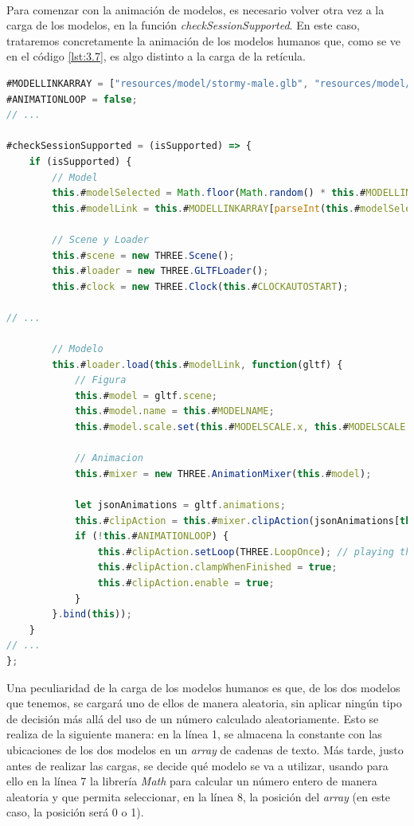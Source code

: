 \documentclass{subfiles}
\begin{document}
        \paragraph{}
        Para comenzar con la animación de modelos, es necesario volver otra vez a la carga de los modelos, en la función \textit{checkSessionSupported}. En este caso, trataremos concretamente la animación de los modelos humanos que, como se ve en el código \ref{lst:3.7}, es algo distinto a la carga de la retícula.

\newpage
\begin{lstlisting}[language=JavaScript, caption={Carga de modelo humano.}, label={lst:3.7}, float=ht]
#MODELLINKARRAY = ["resources/model/stormy-male.glb", "resources/model/stormie-female.glb"];
#ANIMATIONLOOP = false;
// ...

#checkSessionSupported = (isSupported) => {
    if (isSupported) {
        // Model
        this.#modelSelected = Math.floor(Math.random() * this.#MODELLINKARRAY.length);
        this.#modelLink = this.#MODELLINKARRAY[parseInt(this.#modelSelected)];

        // Scene y Loader
        this.#scene = new THREE.Scene();
        this.#loader = new THREE.GLTFLoader();
        this.#clock = new THREE.Clock(this.#CLOCKAUTOSTART);

// ...

        // Modelo
        this.#loader.load(this.#modelLink, function(gltf) {
            // Figura
            this.#model = gltf.scene;
            this.#model.name = this.#MODELNAME;
            this.#model.scale.set(this.#MODELSCALE.x, this.#MODELSCALE.y, this.#MODELSCALE.z);

            // Animacion
            this.#mixer = new THREE.AnimationMixer(this.#model);

            let jsonAnimations = gltf.animations;
            this.#clipAction = this.#mixer.clipAction(jsonAnimations[this.#MODELANIMATIONNUMBER]);
            if (!this.#ANIMATIONLOOP) {
                this.#clipAction.setLoop(THREE.LoopOnce); // playing the clip once
                this.#clipAction.clampWhenFinished = true;
                this.#clipAction.enable = true;
            }
        }.bind(this));
    } 
// ...
};
\end{lstlisting}

        Una peculiaridad de la carga de los modelos humanos es que, de los dos modelos que tenemos, se cargará uno de ellos de manera aleatoria, sin aplicar ningún tipo de decisión más allá del uso de un número calculado aleatoriamente. Esto se realiza de la siguiente manera: en la línea 1, se almacena la constante con las ubicaciones de los dos modelos en un \textit{array} de cadenas de texto. Más tarde, justo antes de realizar las cargas, se decide qué modelo se va a utilizar, usando para ello en la línea 7 la librería \textit{Math} para calcular un número entero de manera aleatoria y que permita seleccionar, en la línea 8, la posición del \textit{array} (en este caso, la posición será 0 o 1).
\end{document}

